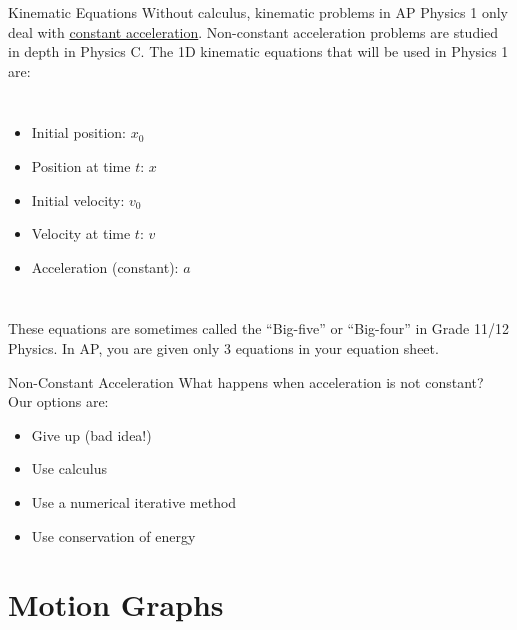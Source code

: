\documentclass[12pt,compress,aspectratio=169]{beamer}
\begin{document}
\begin{frame}{Kinematic Equations}
  Without calculus, kinematic problems in AP Physics 1 only deal with
  \underline{constant acceleration}. Non-constant acceleration problems are
  studied in depth in Physics C. The 1D kinematic equations that will be used
  in Physics 1 are:
  \begin{columns}

    \vspace{-.3in}{\Large
      \begin{align*}
        x &= x_0+ v_0t + \frac12at^2\\
        v &= v_0+at\\
        v^2 &= v_0^2+ 2a(x-x_0)
      \end{align*}
    }
    
    \begin{itemize}
    \item Initial position: $x_0$
    \item Position at time $t$: $x$
    \item Initial velocity: $v_0$
    \item Velocity at time $t$: $v$
    \item Acceleration (constant): $a$
    \end{itemize}
  \end{columns}
  These equations are sometimes called the ``Big-five'' or ``Big-four''
  in Grade 11/12 Physics. In AP, you are given only 3 equations in your
  equation sheet.
\end{frame}


\begin{frame}{Non-Constant Acceleration}
  What happens when acceleration is not constant? Our options are:
  \begin{itemize}
  \item Give up (bad idea!)
  \item Use calculus
  \item Use a numerical iterative method
  \item<alert@1>Use conservation of energy
  \end{itemize}
\end{frame}

\section{Motion Graphs}
\end{document}

